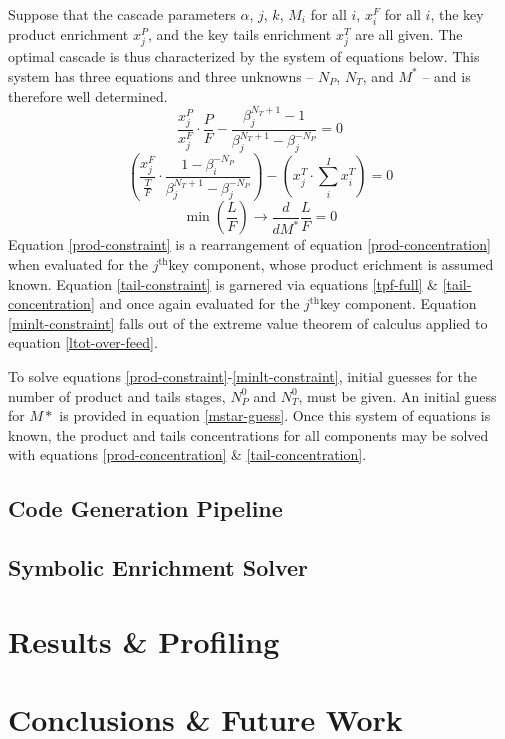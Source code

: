 \documentclass[preprint,12pt]{elsarticle}
\newcommand{\superscript}[1]{\ensuremath{^{\textrm{#1}}}}
\newcommand{\jth}[0]{$j$\superscript{th}}
\begin{document}
Suppose that the cascade parameters 
$\alpha$, 
$j$, $k$, 
$M_i$ for all $i$, 
$x_i^F$ for all $i$, 
the key product enrichment $x_j^P$, and the key 
tails enrichment $x_j^T$ are all given.  The optimal cascade is thus characterized by 
the system of equations below. This system has three equations and three unknowns --
$N_P$, $N_T$, and $M^*$ -- and is therefore well determined.
\begin{equation}
\frac{x_j^P}{x_j^F}\cdot\frac{P}{F} - \frac{\beta_j^{N_T+1} - 1}
                                           {\beta_j^{N_T+1} - \beta_j^{-N_P}} = 0
\label{prod-constraint}
\end{equation}
\begin{equation}
\left(\frac{x_j^F}{\frac{T}{F}} \cdot \frac{1 - \beta_i^{-N_P}}
                                           {\beta_j^{N_T+1} - \beta_j^{-N_P}} \right)
- \left(x_j^T\cdot\sum_i^{I} x_i^T\right) = 0
\label{tail-constraint}
\end{equation}
\begin{equation}
\min\left(\frac{L}{F}\right)\to \frac{d}{dM^*} \frac{L}{F} = 0
\label{minlt-constraint}
\end{equation}
Equation \ref{prod-constraint} is a rearrangement of equation \ref{prod-concentration}
when evaluated for the \jth key component, whose product erichment is assumed
known.  Equation \ref{tail-constraint} is garnered via equations \ref{tpf-full} \&
\ref{tail-concentration} and once again evaluated for the \jth key component.
Equation \ref{minlt-constraint} falls out of the extreme value theorem of calculus
applied to equation \ref{ltot-over-feed}.

To solve equations \ref{prod-constraint}-\ref{minlt-constraint}, initial guesses
for the number of product and tails stages, $N_P^0$ and $N_T^0$, must be given.
An initial guess for $M*$ is provided in equation \ref{mstar-guess}.  Once this system
of equations is known, the product and tails concentrations for all components may be 
solved with equations \ref{prod-concentration} \& \ref{tail-concentration}.

\subsection{Code Generation Pipeline}
\label{sec:codegen}

\subsection{Symbolic Enrichment Solver}
\label{sec:symes}

\section{Results \& Profiling}
\label{sec:res}

\section{Conclusions \& Future Work}
\label{sec:conc}


\end{document}
